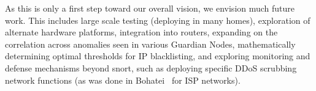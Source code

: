 As this is only a first step toward our overall vision, we envision much future work.
This includes large scale testing (deploying in many homes), exploration of alternate hardware platforms, integration into routers, expanding on the correlation across anomalies seen in various Guardian Nodes, mathematically determining optimal thresholds for IP blacklisting, and exploring 
monitoring and defense mechanisms beyond snort, such as deploying specific DDoS scrubbing network functions (as was done in Bohatei~\cite{bohatei} for ISP networks).

%
%

